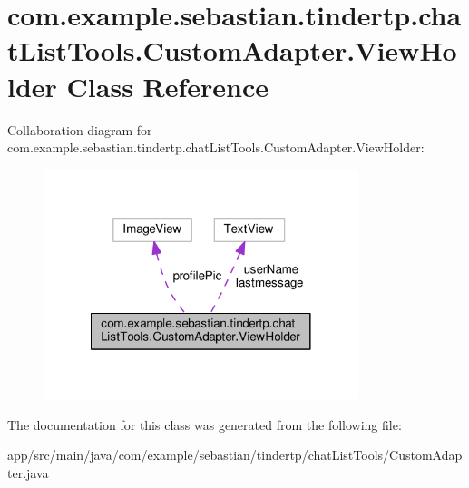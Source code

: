 \hypertarget{classcom_1_1example_1_1sebastian_1_1tindertp_1_1chatListTools_1_1CustomAdapter_1_1ViewHolder}{}\section{com.\+example.\+sebastian.\+tindertp.\+chat\+List\+Tools.\+Custom\+Adapter.\+View\+Holder Class Reference}
\label{classcom_1_1example_1_1sebastian_1_1tindertp_1_1chatListTools_1_1CustomAdapter_1_1ViewHolder}


Collaboration diagram for com.\+example.\+sebastian.\+tindertp.\+chat\+List\+Tools.\+Custom\+Adapter.\+View\+Holder\+:
\nopagebreak
\begin{figure}[H]
\begin{center}
\leavevmode
\includegraphics[width=260pt]{classcom_1_1example_1_1sebastian_1_1tindertp_1_1chatListTools_1_1CustomAdapter_1_1ViewHolder__coll__graph}
\end{center}
\end{figure}


The documentation for this class was generated from the following file\+:\begin{DoxyCompactItemize}
\item 
app/src/main/java/com/example/sebastian/tindertp/chat\+List\+Tools/Custom\+Adapter.\+java\end{DoxyCompactItemize}
